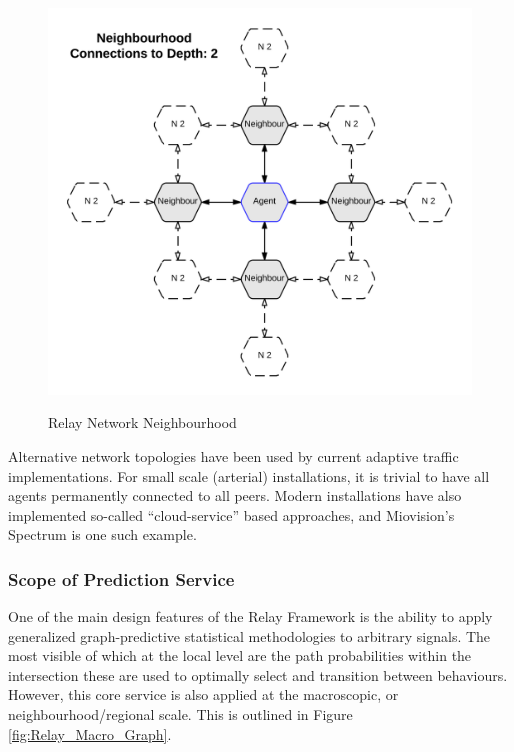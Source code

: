 \documentclass{article}
\begin{document}
\begin{figure}[!htpb]
	\caption{Relay Network Neighbourhood}
	\includegraphics[width=\textwidth]{figures/Relay_Network.png}
	\label{fig:Relay_Network}
\end{figure}

Alternative network topologies have been used by current adaptive traffic implementations.
For small scale (arterial) installations, it is trivial to have all agents permanently connected to all peers.
Modern installations have also implemented so-called ``cloud-service'' based approaches, and Miovision's Spectrum is one such example.\\

\subsubsection{Scope of Prediction Service}

One of the main design features of the Relay Framework is the ability to apply generalized graph-predictive statistical methodologies to arbitrary signals.
The most visible of which at the local level are the path probabilities within the intersection these are used to optimally select and transition between behaviours.
However, this core service is also applied at the macroscopic, or neighbourhood/regional scale.
This is outlined in Figure \ref{fig:Relay_Macro_Graph}.\\
\end{document}
